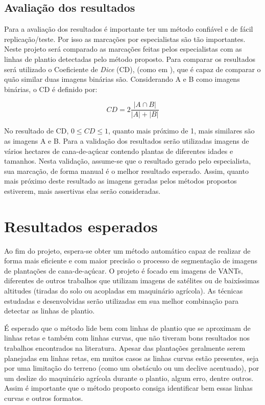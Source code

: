 \documentclass[12pt, a4paper, english, brazil]{article}
\begin{document}
\subsection{Avaliação dos resultados}

Para a avaliação dos resultados é importante ter um método confiável e de fácil replicação/teste. Por isso as marcações por especialistas são tão importantes. Neste projeto será comparado as marcações feitas pelos especialistas com as linhas de plantio detectadas pelo método proposto. Para comparar os resultados será utilizado o Coeficiente de \textit{Dice} (CD), (como em ), que é capaz de comparar o quão similar duas imagens binárias são. Considerando A e B como imagens binárias, o CD é definido por:

\begin{equation}
    CD = 2 \frac{|A \cap B|}{|A| + |B|}
\end{equation}

No resultado de CD, $0 \le CD \le 1$, quanto mais próximo de 1, mais similares são as imagens A e B. Para a validação dos resultados serão utilizadas imagens de vários hectares de cana-de-açúcar contendo plantas de diferentes idades e tamanhos. Nesta validação, assume-se que o resultado gerado pelo especialista, sua marcação, de forma manual é o melhor resultado esperado. Assim, quanto mais próximo deste resultado as imagens geradas pelos métodos propostos estiverem, mais assertivas elas serão consideradas.

\section{Resultados esperados}

Ao fim do projeto, espera-se obter um método automático capaz de realizar de forma mais eficiente e com maior precisão o processo de segmentação de imagens de plantações de cana-de-açúcar. O projeto é focado em imagens de VANTs, diferentes de outros trabalhos que utilizam imagens de satélites ou de baixíssimas altitudes (tiradas do solo ou acopladas em maquinário agrícola). As técnicas estudadas e desenvolvidas serão utilizadas em sua melhor combinação para detectar as linhas de plantio.

É esperado que o método lide bem com linhas de plantio que se aproximam de linhas retas e também com linhas curvas, que não tiveram bons resultados nos trabalhos encontrados na literatura. Apesar das plantações geralmente serem planejadas em linhas retas, em muitos casos as linhas curvas estão presentes, seja por uma limitação do terreno (como um obstáculo ou um declive acentuado), por um deslize do maquinário agrícola durante o plantio, algum erro, dentre outros. Assim é importante que o método proposto consiga identificar bem essas linhas curvas e outros formatos.
\end{document}
